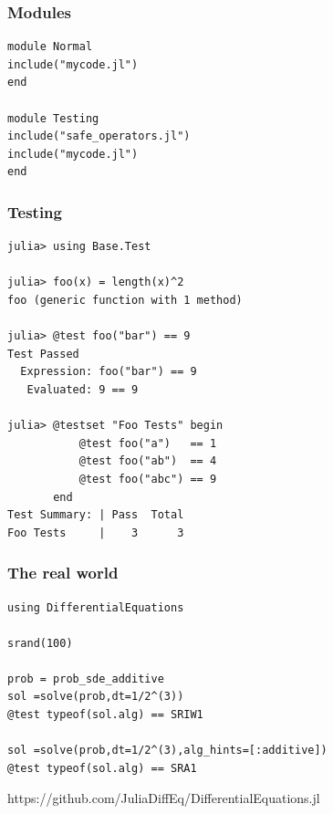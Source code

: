 \begin{frame}[fragile]
	\frametitle{Modules}
  \begin{tiny}
  \begin{verbatim}
module Normal
include("mycode.jl")
end

module Testing
include("safe_operators.jl")
include("mycode.jl")
end
  \end{verbatim}
  \end{tiny}
\end{frame}

\begin{frame}[fragile]
	\frametitle{Testing}
  \begin{tiny}
  \begin{verbatim}
julia> using Base.Test

julia> foo(x) = length(x)^2
foo (generic function with 1 method)

julia> @test foo("bar") == 9
Test Passed
  Expression: foo("bar") == 9
   Evaluated: 9 == 9

julia> @testset "Foo Tests" begin
           @test foo("a")   == 1
           @test foo("ab")  == 4
           @test foo("abc") == 9
       end
Test Summary: | Pass  Total
Foo Tests     |    3      3
  \end{verbatim}
  \end{tiny}
\end{frame}

\begin{frame}[fragile]
	\frametitle{The real world}
  \begin{tiny}
  \begin{verbatim}
using DifferentialEquations

srand(100)

prob = prob_sde_additive
sol =solve(prob,dt=1/2^(3))
@test typeof(sol.alg) == SRIW1

sol =solve(prob,dt=1/2^(3),alg_hints=[:additive])
@test typeof(sol.alg) == SRA1
  \end{verbatim}
  \end{tiny}
  \vspace{5.0mm}
   https://github.com/JuliaDiffEq/DifferentialEquations.jl
\end{frame}
